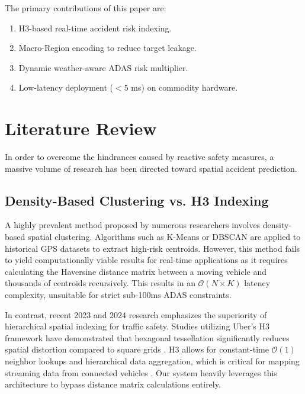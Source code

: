 \documentclass[conference]{IEEEtran}
\begin{document}
The primary contributions of this paper are:
\begin{enumerate}
    \item H3-based real-time accident risk indexing.
    \item Macro-Region encoding to reduce target leakage.
    \item Dynamic weather-aware ADAS risk multiplier.
    \item Low-latency deployment ($<5$ ms) on commodity hardware.
\end{enumerate}


\section{Literature Review}
In order to overcome the hindrances caused by reactive safety measures, a massive volume of research has been directed toward spatial accident prediction. 

\subsection{Density-Based Clustering vs. H3 Indexing}
A highly prevalent method proposed by numerous researchers involves density-based spatial clustering. Algorithms such as K-Means or DBSCAN are applied to historical GPS datasets to extract high-risk centroids. However, this method fails to yield computationally viable results for real-time applications as it requires calculating the Haversine distance matrix between a moving vehicle and thousands of centroids recursively. This results in an $\mathcal{O}(N \times K)$ latency complexity, unsuitable for strict sub-100ms ADAS constraints. 

In contrast, recent 2023 and 2024 research emphasizes the superiority of hierarchical spatial indexing for traffic safety. Studies utilizing Uber's H3 framework have demonstrated that hexagonal tessellation significantly reduces spatial distortion compared to square grids \cite{h3_uber}. H3 allows for constant-time $\mathcal{O}(1)$ neighbor lookups and hierarchical data aggregation, which is critical for mapping streaming data from connected vehicles \cite{h3_uber}. Our system heavily leverages this architecture to bypass distance matrix calculations entirely.
\end{document}
